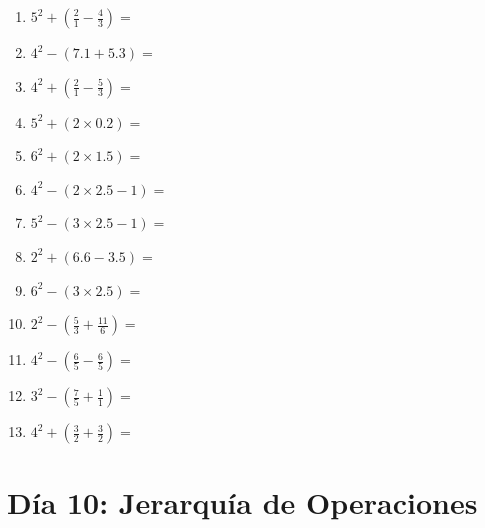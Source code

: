 \documentclass[12pt]{article}
\begin{document}
\begin{enumerate}
\item \large $ 5^{2} + (\frac{2}{1} - \frac{4}{3}) = $ \vspace{1.4cm}
\newpage
\item \large $ 4^{2} - (7.1 + 5.3) = $ \vspace{1.4cm}
\item \large $ 4^{2} + (\frac{2}{1} - \frac{5}{3}) = $ \vspace{1.4cm}
\item \large $ 5^{2} + (2 \times 0.2) = $ \vspace{1.4cm}
\item \large $ 6^{2} + (2 \times 1.5) = $ \vspace{1.4cm}
\item \large $ 4^{2} - (2 \times 2.5 - 1) = $ \vspace{1.4cm}
\item \large $ 5^{2} - (3 \times 2.5 - 1) = $ \vspace{1.4cm}
\item \large $ 2^{2} + (6.6 - 3.5) = $ \vspace{1.4cm}
\item \large $ 6^{2} - (3 \times 2.5) = $ \vspace{1.4cm}
\item \large $ 2^{2} - (\frac{5}{3} + \frac{11}{6}) = $ \vspace{1.4cm}
\item \large $ 4^{2} - (\frac{6}{5} - \frac{6}{5}) = $ \vspace{1.4cm}
\newpage
\item \large $ 3^{2} - (\frac{7}{5} + \frac{1}{1}) = $ \vspace{1.4cm}
\item \large $ 4^{2} + (\frac{3}{2} + \frac{3}{2}) = $ \vspace{1.4cm}
\end{enumerate}
\newpage
\section*{Día 10: Jerarquía de Operaciones}
\end{document}
